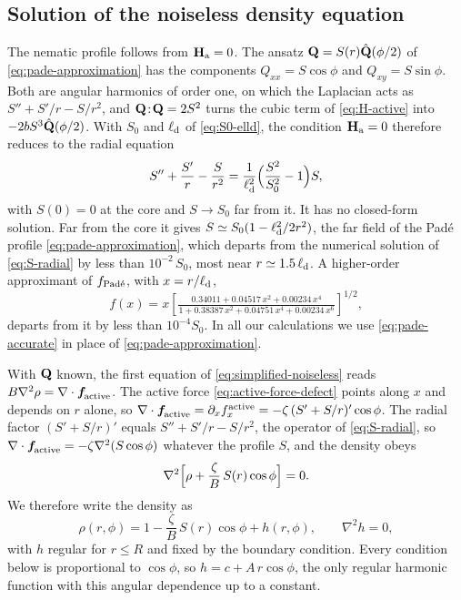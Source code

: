 \documentclass[aps,pre,reprint,superscriptaddress,longbibliography,nofootinbib
]{revtex4-2}
\begin{document}
\subsection{Solution of the noiseless density equation}
\label{app:density-poisson}
The nematic profile follows from $\mathbf{H}_\text{a}=0$. The ansatz
$\mathbf{Q}=S(r)\hat{\mathbf{Q}}(\phi/2)$ of \cref{eq:pade-approximation} has
the components $Q_{xx}=S\cos\phi$ and $Q_{xy}=S\sin\phi$.
Both are angular harmonics of order one, on which the
Laplacian acts as $S''+S'/r-S/r^2$, and $\mathbf{Q}\!:\!\mathbf{Q}=2S^2$
turns the cubic term of \cref{eq:H-active} into
$-2bS^3\hat{\mathbf{Q}}(\phi/2)$. With $S_0$ and $\ell_{\rm d}$ of
\cref{eq:S0-elld}, the condition $\mathbf{H}_\text{a}=0$ therefore reduces
to the radial equation
\begin{align}
  \label{eq:S-radial}
  S''+\frac{S'}{r}-\frac{S}{r^2}=\frac{1}{\ell_{\rm d}^2}\Bigl(\frac{S^2}{S_0^2}-1\Bigr)S,
\end{align}
with $S(0)=0$ at the core and $S\to S_0$ far from it. It
has no closed-form solution. Far from the core it gives
$S\simeq S_0(1-\ell_{\rm d}^2/2r^2)$, the far field of the Pad\'e
profile \cref{eq:pade-approximation}, which departs from
the numerical solution of \cref{eq:S-radial} by less than
$10^{-2}\,S_0$, most near $r\simeq1.5\,\ell_{\rm d}$. A
higher-order approximant of $f_{\text{Pad\'{e}}}$, with $x=r/\ell_{\rm d}$,
\begin{equation}
  \label{eq:pade-accurate}
  f(x)=x\left[\tfrac{0.34011+0.04517\,x^2+0.00234\,x^4}
  {1+0.38387\,x^2+0.04751\,x^4+0.00234\,x^6}\right]^{1/2}\!\!\!,
\end{equation}
departs from it by less than $10^{-4}S_0$. In all our
calculations we use \cref{eq:pade-accurate} in place of
\cref{eq:pade-approximation}.

With $\mathbf{Q}$ known, the first equation of
\cref{eq:simplified-noiseless} reads
$B\nabla^2\rho=\nabla\cdot\boldsymbol{f}_\text{\!active}$. The active force
\cref{eq:active-force-defect} points along $x$ and depends
on $r$ alone, so
$\nabla\cdot\boldsymbol{f}_\text{\!active}=\partial_x{f}^\text{active}_x
=-\zeta\,(S'+S/r)'\cos\phi$. The radial factor $(S'+S/r)'$
equals $S''+S'/r-S/r^2$, the operator of
\cref{eq:S-radial}, so
$\nabla\cdot\boldsymbol{f}_\text{\!active}=-\zeta\nabla^2(S\cos\phi)$ whatever the
profile $S$, and the density obeys
\begin{align}
  \label{eq:rho-harmonic}
  \nabla^2\Bigl[\rho+\frac{\zeta}{B}\,S(r)\cos\phi\Bigr]=0 .
\end{align}
We therefore write the density as
\begin{equation}
  \label{eq:rho-h}
  \rho(r,\phi)=1-\frac{\zeta}{B}\,S(r)\cos\phi+h(r,\phi),\qquad \nabla^2h=0,
\end{equation}
with $h$ regular for $r\le R$ and fixed by the boundary
condition. Every condition below is proportional to
$\cos\phi$, so $h=c+A\,r\cos\phi$, the only regular
harmonic function with this angular dependence up to a
constant.
\end{document}
